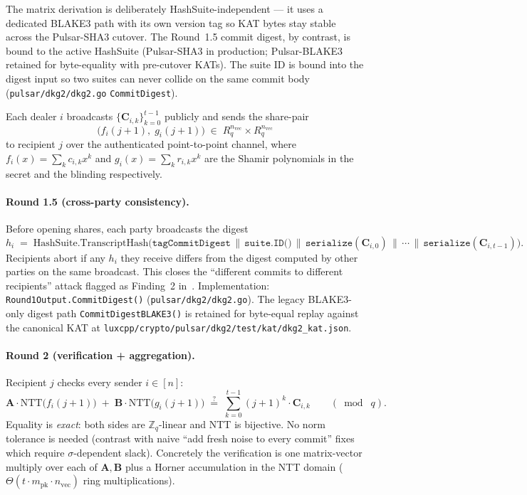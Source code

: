 The matrix derivation is deliberately HashSuite-independent --- it uses a
dedicated BLAKE3 path with its own version tag so KAT bytes stay stable
across the Pulsar-SHA3 cutover. The Round~1.5 commit digest, by
contrast, is bound to the active HashSuite (Pulsar-SHA3 in production;
Pulsar-BLAKE3 retained for byte-equality with pre-cutover KATs). The
suite ID is bound into the digest input so two suites can never collide
on the same commit body
(\texttt{pulsar/dkg2/dkg2.go} \texttt{CommitDigest}).

Each dealer $i$ broadcasts $\{\mathbf{C}_{i,k}\}_{k=0}^{t-1}$ publicly
and sends the share-pair
\begin{equation}
\label{eq:share-pair}
\bigl(f_i(j+1),\;g_i(j+1)\bigr)
\;\in\; R_q^{n_{\textrm{vec}}}\times R_q^{n_{\textrm{vec}}}
\end{equation}
to recipient $j$ over the authenticated point-to-point channel, where
$f_i(x) = \sum_k c_{i,k} x^k$ and $g_i(x) = \sum_k r_{i,k} x^k$ are the
Shamir polynomials in the secret and the blinding respectively.

\paragraph{Round 1.5 (cross-party consistency).}
Before opening shares, each party broadcasts the digest
\[
h_i \;=\; \mathrm{HashSuite.TranscriptHash}\bigl(
  \texttt{tagCommitDigest}\,\|\,\texttt{suite.ID()}\,\|\,
  \texttt{serialize}(\mathbf{C}_{i,0})\,\|\,\cdots\,\|\,
  \texttt{serialize}(\mathbf{C}_{i,t-1})
\bigr).
\]
Recipients abort if any $h_i$ they receive differs from the digest
computed by other parties on the same broadcast. This closes the
``different commits to different recipients'' attack flagged as
Finding~2 in~\cite{red-dkg-review}. Implementation:
\texttt{Round1Output.CommitDigest()}
(\texttt{pulsar/dkg2/dkg2.go}). The legacy BLAKE3-only digest path
\texttt{CommitDigestBLAKE3()} is retained for byte-equal replay against
the canonical KAT at
\texttt{luxcpp/crypto/pulsar/dkg2/test/kat/dkg2\_kat.json}.

\paragraph{Round 2 (verification + aggregation).}
Recipient $j$ checks every sender $i\in[n]$:
\begin{equation}
\label{eq:pedersen-verify}
\mathbf{A}\cdot\mathrm{NTT}\!\bigl(f_i(j+1)\bigr)
\;+\;
\mathbf{B}\cdot\mathrm{NTT}\!\bigl(g_i(j+1)\bigr)
\;\stackrel{?}{=}\;
\sum_{k=0}^{t-1}(j+1)^k\cdot\mathbf{C}_{i,k}
\qquad(\bmod\;q).
\end{equation}
Equality is \emph{exact}: both sides are $\mathbb{Z}_q$-linear and NTT
is bijective. No norm tolerance is needed (contrast with naive ``add
fresh noise to every commit'' fixes which require $\sigma$-dependent
slack). Concretely the verification is one matrix-vector multiply over
each of $\mathbf{A}, \mathbf{B}$ plus a Horner accumulation in the NTT
domain ($\Theta(t\cdot m_{\textrm{pk}}\cdot n_{\textrm{vec}})$ ring
multiplications).

